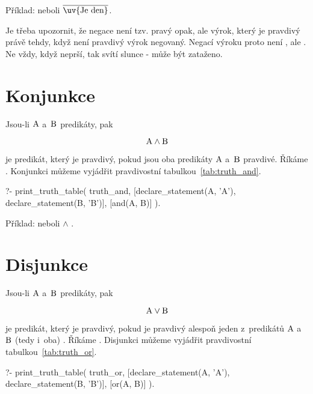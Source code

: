 Příklad:  neboli \(\overline{\predicate{\text{\uv{Je den}}}}\).

Je třeba upozornit, že negace není tzv. pravý opak, ale výrok, který je pravdivý právě tehdy, když není pravdivý výrok negovaný. Negací výroku  proto není , ale . Ne vždy, když neprší, tak svítí slunce - může být zataženo.

\section{Konjunkce}

Jsou-li \(\mathrm{A}\) a~\(\mathrm{B}\) predikáty, pak

\begin{equation}
\mathrm{A} \land \mathrm{B} 
\end{equation}

je predikát, který je pravdivý, pokud jsou oba predikáty \(\mathrm{A}\) a~\(\mathrm{B}\) pravdivé. Říkáme .
Konjunkci můžeme vyjádřit pravdivostní tabulkou~\ref{tab:truth_and}.

\begin{prolog}
?- print_truth_table(
	truth_and,
	[declare_statement(A, 'A'), declare_statement(B, 'B')],
	[and(A, B)]
).
\end{prolog}

Příklad:  neboli  \(\land\) .

\section{Disjunkce}

Jsou-li \(\mathrm{A}\) a~\(\mathrm{B}\) predikáty, pak

\begin{equation}
\mathrm{A} \lor \mathrm{B}
\end{equation}

je predikát, který je pravdivý, pokud je pravdivý alespoň jeden z~predikátů \(\mathrm{A}\) a~\(\mathrm{B}\) (tedy i~oba) . Říkáme .
Disjunkci můžeme vyjádřit pravdivostní tabulkou~\ref{tab:truth_or}.

\begin{prolog}
?- print_truth_table(
	truth_or,
	[declare_statement(A, 'A'), declare_statement(B, 'B')],
	[or(A, B)]
).
\end{prolog}

